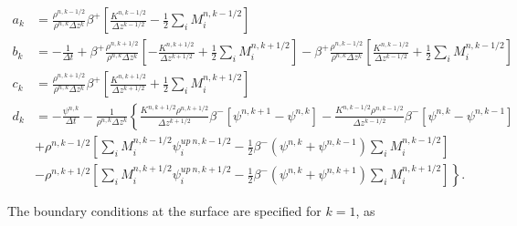 \documentclass[dvipdfmx,a4paper,10pt]{article}
\begin{document}
\begin{align*}
  a_k &=  \frac{\rho^{n,k-1/2}}{\rho^{n,k}\Delta z^k}\beta^+ \left[ \frac{K^{n,k-1/2}}{\Delta z ^{k-1/2}}-\frac{1}{2} \sum_iM_i^{n,k-1/2}\right]\\
    b_k &= -\frac{1}{\Delta t} + \beta^+\frac{\rho^{n,k+1/2}}{\rho^{n,k}\Delta z^k} \left[-\frac{K^{n,k+1/2}}{\Delta z ^{k+1/2}}+\frac{1}{2}\sum_iM_i^{n,k+1/2} \right]-\beta^+\frac{\rho^{n,k-1/2}}{\rho^{n,k}\Delta z^k} \left[\frac{K^{n,k-1/2}}{\Delta z ^{k-1/2}}+\frac{1}{2}\sum_iM_i^{n,k-1/2} \right] \\
      c_k &= \frac{\rho^{n,k+1/2}}{\rho^{n,k}\Delta z^k}\beta^+\left[ \frac{K^{n,k+1/2}}{\Delta z ^{k+1/2}}+\frac{1}{2}\sum_iM_i^{n,k+1/2} \right] \\
      d_k &=-\frac{\psi^{n,k}}{\Delta t} - \frac{1}{\rho^{n,k}\Delta z^k} \left\{ \frac{K^{n,k+1/2}\rho^{n,k+1/2}}{\Delta z^{k+1/2}}\beta^{-}\left[\psi^{n,k+1} - \psi^{n,k}\right]-\frac{K^{n,k-1/2}\rho^{n,k-1/2}}{\Delta z^{k-1/2}}\beta^{-}\left[\psi^{n,k} - \psi^{n,k-1}\right]\right.   \\   
          & \left.+\rho^{n,k-1/2}\left[\sum_iM_i^{n,k-1/2}\psi_i^{up~n,k-1/2} - \frac{1}{2}\beta^{-}(\psi^{n,k}+\psi^{n,k-1})\sum_iM_i^{n,k-1/2} \right]\right.\\
          & \left. -\rho^{n,k+1/2}\left[\sum_iM_i^{n,k+1/2}\psi_i^{up~n,k+1/2} - \frac{1}{2}\beta^{-}(\psi^{n,k}+\psi^{n,k+1})\sum_iM_i^{n,k+1/2} \right] \right\}.
\end{align*}

\noindent The boundary conditions at the surface are specified for $k=1$, as
\end{document}

